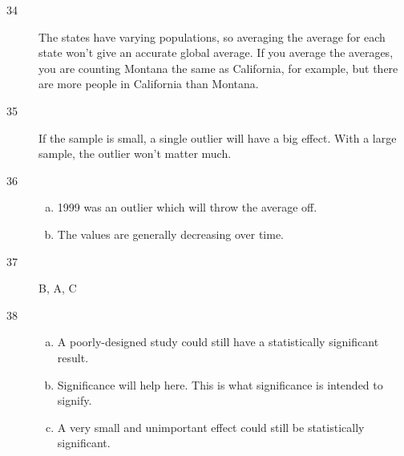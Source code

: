 \documentclass[letterpaper, landscape]{exam}
\begin{document}
    \begin{description}

      \item[34] 

        The states have varying populations, so averaging the average for
        each state won't give an accurate global average. If you average the
        averages, you are counting Montana the same as California, for example,
        but there are more people in California than Montana.

      \item[35] If the sample is small, a single outlier will have a big effect.
        With a large sample, the outlier won't matter much. 

      \item[36] 
        \begin{enumerate}[(a)]
          \item 1999 was an outlier which will throw the average off.
          \item The values are generally decreasing over time.
        \end{enumerate}

      \newpage

      \item[37] B, A, C


      \item[38]
        \begin{enumerate}[(a)]
          \item A poorly-designed study could still have a statistically
            significant result.

          \item Significance will help here. This is what significance is
            intended to signify.

          \item A very small and unimportant effect could still be statistically
            significant.

        \end{enumerate}


\end{description}
\end{document}
